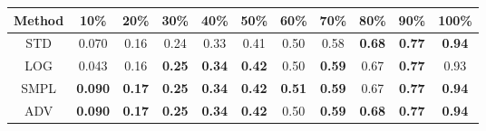 \documentclass{standalone}
\begin{document}
\begin{tabular}{c|cccccccccc}
      \toprule
      Method & 10\% & 20\% & 30\% & 40\% & 50\% & 60\% & 70\% & 80\% & 90\% & 100\% \\
      \midrule
STD & 0.070 & 0.16 & 0.24 & 0.33 & 0.41 & 0.50 & 0.58 & \textbf{0.68} & \textbf{0.77} & \textbf{0.94}\\
LOG & 0.043 & 0.16 & \textbf{0.25} & \textbf{0.34} & \textbf{0.42} & 0.50 & \textbf{0.59} & 0.67 & \textbf{0.77} & 0.93\\
SMPL & \textbf{0.090} & \textbf{0.17} & \textbf{0.25} & \textbf{0.34} & \textbf{0.42} & \textbf{0.51} & \textbf{0.59} & 0.67 & \textbf{0.77} & \textbf{0.94}\\
ADV & \textbf{0.090} & \textbf{0.17} & \textbf{0.25} & \textbf{0.34} & \textbf{0.42} & 0.50 & \textbf{0.59} & \textbf{0.68} & \textbf{0.77} & \textbf{0.94}\\
  \bottomrule
\end{tabular}
\end{document}

